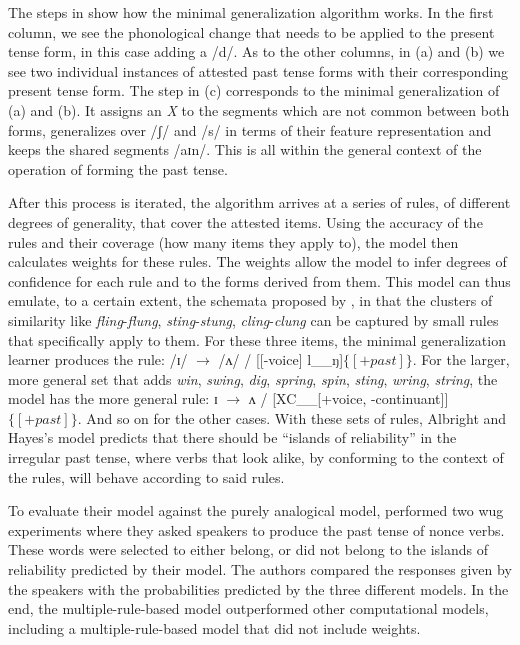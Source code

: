 The steps in  show how the minimal generalization algorithm works. In the first column, we see the phonological change that needs to be applied to the present tense form, in this case adding a /d/. As to the other columns, in (a) and (b) we see two individual instances of attested past tense forms with their corresponding present tense form. The step in (c) corresponds to the minimal generalization of (a) and (b). It assigns an \textit{X} to the segments which are not common between both forms, generalizes over /ʃ/ and /s/ in terms of their feature representation and keeps the shared segments /aɪn/. This is all within the general context of the operation of forming the past tense.

After this process is iterated, the algorithm arrives at a series of rules, of different degrees of generality, that cover the attested items. Using the accuracy of the rules and their coverage (how many items they apply to), the model then calculates weights for these rules. The weights allow the model to infer degrees of confidence for each rule and to the forms derived from them. This model can thus emulate, to a certain extent, the schemata proposed by \textcite{Bybee.1982}, in that the clusters of similarity like \textit{fling}-\textit{flung}, \textit{sting}-\textit{stung}, \textit{cling}-\textit{clung} can be captured by small rules that specifically apply to them. For these three items, the minimal generalization learner produces the rule: /ɪ/ $\rightarrow$ /ʌ/ / [[-voice] l\_\_ŋ]$\{[+past]\}$. For the larger, more general set that adds \textit{win}, \textit{swing}, \textit{dig}, \textit{spring}, \textit{spin}, \textit{sting}, \textit{wring}, \textit{string}, the model has the more general rule: ɪ $\rightarrow$ ʌ / [XC\_\_[+voice, -continuant]]$\{[+past]\}$. And so on for the other cases. With these sets of rules, Albright and Hayes's model predicts that there should be ``islands of reliability'' in the irregular past tense, where verbs that look alike, by conforming to the context of the rules, will behave according to said rules.

To evaluate their model against the purely analogical model, \textcite{Albright.2003} performed two wug experiments where they asked speakers to produce the past tense of nonce verbs. These words were selected to either belong, or did not belong to the islands of reliability predicted by their model. The authors compared the responses given by the speakers with the probabilities predicted by the three different models. In the end, the multiple-rule-based model outperformed other computational models, including a multiple-rule-based model that did not include weights.

